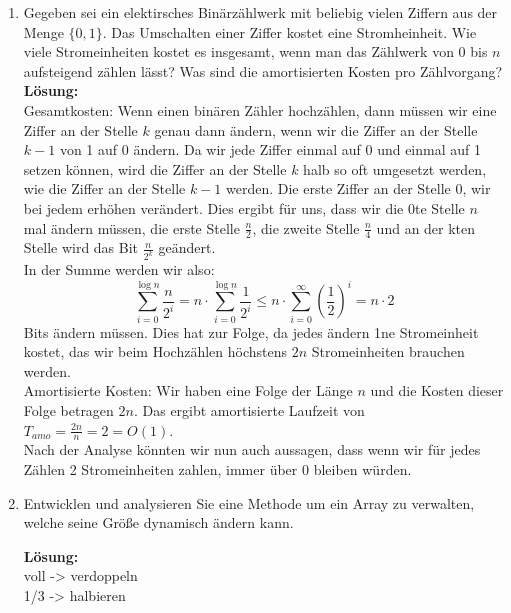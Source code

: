 \documentclass[11pt,a4paper,ngerman]{article}
\begin{document}
\begin{enumerate}[\bfseries a)]

\item Gegeben sei ein elektirsches Binärzählwerk mit beliebig vielen Ziffern aus der Menge $\{ 0, 1\}$. Das Umschalten einer Ziffer kostet eine Stromheinheit. Wie viele Stromeinheiten kostet es insgesamt, wenn man das Zählwerk von 0 bis $n$ aufsteigend zählen lässt? Was sind die amortisierten Kosten pro Zählvorgang?\\

\textbf{Lösung:}\\
Gesamtkosten: Wenn einen binären Zähler hochzählen, dann müssen wir eine Ziffer an der Stelle $k$ genau dann ändern, wenn wir die Ziffer an der Stelle $k-1$ von 1 auf 0 ändern. Da wir jede Ziffer einmal auf 0 und einmal auf 1 setzen können, wird die Ziffer an der Stelle $k$ halb so oft umgesetzt werden, wie die Ziffer an der Stelle $k-1$ werden. Die erste Ziffer an der Stelle 0, wir bei jedem erhöhen verändert. Dies ergibt für uns, dass wir die 0te Stelle $n$ mal ändern müssen, die erste Stelle $\frac{n}{2}$, die zweite Stelle $\frac{n}{4}$ und an der kten Stelle wird das Bit $\frac{n}{2^k}$ geändert.\\

In der Summe werden wir also:
$$
\sum_{i=0}^{\log n} \frac{n}{2^i} = n \cdot \sum_{i=0}^{\log n} \frac{1}{2^i} \leq n \cdot \sum_{i=0}^{\infty} \left( \frac{1}{2} \right)^i = n\cdot 2
$$
Bits ändern müssen. Dies hat zur Folge, da jedes ändern 1ne Stromeinheit kostet, das wir beim Hochzählen höchstens $2n$ Stromeinheiten brauchen werden.\\

Amortisierte Kosten: Wir haben eine Folge der Länge $n$ und die Kosten dieser Folge betragen $2n$. Das ergibt amortisierte Laufzeit von $T_{amo} = \frac{2n}{n} = 2 = O(1)$.\\

Nach der Analyse könnten wir nun auch aussagen, dass wenn wir für jedes Zählen 2 Stromeinheiten zahlen, immer über 0 bleiben würden.

\item Entwicklen und analysieren Sie eine Methode um ein Array zu verwalten, welche seine Größe dynamisch ändern kann.

\textbf{Lösung:}\\

voll -> verdoppeln\\
1/3 -> halbieren

\end{enumerate}
\end{document}
